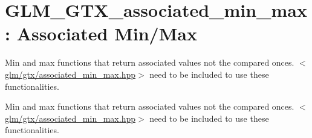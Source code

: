 \hypertarget{group__gtx__associated__min__max}{\section{\-G\-L\-M\-\_\-\-G\-T\-X\-\_\-associated\-\_\-min\-\_\-max\-: \-Associated \-Min/\-Max}
\label{group__gtx__associated__min__max}
}


\-Min and max functions that return associated values not the compared onces. $<$\hyperlink{associated__min__max_8hpp}{glm/gtx/associated\-\_\-min\-\_\-max.\-hpp}$>$ need to be included to use these functionalities.  


\-Min and max functions that return associated values not the compared onces. $<$\hyperlink{associated__min__max_8hpp}{glm/gtx/associated\-\_\-min\-\_\-max.\-hpp}$>$ need to be included to use these functionalities. 